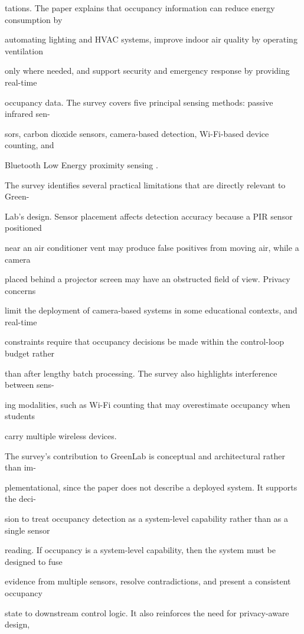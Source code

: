 tations. The paper explains that occupancy information can reduce energy consumption by

automating lighting and HVAC systems, improve indoor air quality by operating ventilation

only where needed, and support security and emergency response by providing real-time

occupancy data. The survey covers ﬁve principal sensing methods: passive infrared sen-

sors, carbon dioxide sensors, camera-based detection, Wi-Fi-based device counting, and

Bluetooth Low Energy proximity sensing \cite{chaudhari2024}.

The survey identiﬁes several practical limitations that are directly relevant to Green-

Lab's design. Sensor placement affects detection accuracy because a PIR sensor positioned

near an air conditioner vent may produce false positives from moving air, while a camera

placed behind a projector screen may have an obstructed ﬁeld of view. Privacy concerns

limit the deployment of camera-based systems in some educational contexts, and real-time

constraints require that occupancy decisions be made within the control-loop budget rather

than after lengthy batch processing. The survey also highlights interference between sens-

ing modalities, such as Wi-Fi counting that may overestimate occupancy when students

carry multiple wireless devices.

The survey's contribution to GreenLab is conceptual and architectural rather than im-

plementational, since the paper does not describe a deployed system. It supports the deci-

sion to treat occupancy detection as a system-level capability rather than as a single sensor

reading. If occupancy is a system-level capability, then the system must be designed to fuse

evidence from multiple sensors, resolve contradictions, and present a consistent occupancy

state to downstream control logic. It also reinforces the need for privacy-aware design,

